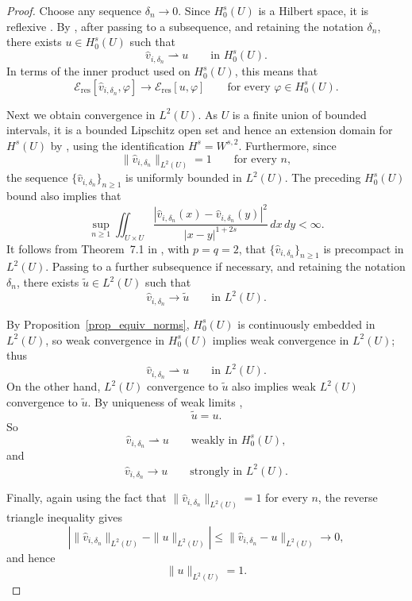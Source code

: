 \documentclass[preprint,12pt]{elsarticle}
\begin{document}
{\begin{proof}
Choose any sequence $\delta_n\to0$. Since $H_0^s(U)$ is a Hilbert
space, it is reflexive \cite[Th.~4.6-6]{Krey}. By
\cite[Th.~3.18]{Brezis}, after passing to a subsequence, and
retaining the notation $\delta_n$, there exists $u\in H_0^s(U)$
such that
\[
    \hat v_{i,\delta_n}
    \rightharpoonup u
    \qquad\text{in }H_0^s(U).
\]
In terms of the inner product used on $H_0^s(U)$, this means
that
\[
    \mathcal E_{\mathrm{res}}
    [\hat v_{i,\delta_n},\varphi]
    \longrightarrow
    \mathcal E_{\mathrm{res}}[u,\varphi]
    \qquad
    \text{for every }\varphi\in H_0^s(U).
\]

Next we obtain convergence in $L^2(U)$. As $U$ is a finite union
of bounded intervals, it is a bounded Lipschitz open set and hence
an extension domain for $H^s(U)$ by \cite[Th.~5.4]{NPV}, using the
identification $H^s=W^{s,2}$. Furthermore, since
\[
    \|\hat v_{i,\delta_n}\|_{L^2(U)}=1
    \qquad\text{for every }n,
\]
the sequence $\{\hat v_{i,\delta_n}\}_{n\geq1}$ is uniformly
bounded in $L^2(U)$. The preceding $H_0^s(U)$ bound also implies
that
\[
    \sup_{n\geq1}
    \iint_{U\times U}
    \frac{
        |\hat v_{i,\delta_n}(x)
        -\hat v_{i,\delta_n}(y)|^2
    }{
        |x-y|^{1+2s}
    }
    \,dx\,dy
    <\infty.
\]
It follows from Theorem~7.1 in \cite{NPV}, with $p=q=2$, that
$\{\hat v_{i,\delta_n}\}_{n\geq1}$ is precompact in $L^2(U)$.
Passing to a further subsequence if necessary, and retaining the
notation $\delta_n$, there exists $\widetilde u\in L^2(U)$ such
that
\[
    \hat v_{i,\delta_n}
    \longrightarrow \widetilde u
    \qquad\text{in }L^2(U).
\]

By Proposition~\ref{prop_equiv_norms}, $H_0^s(U)$ is continuously
embedded in $L^2(U)$, so weak convergence in $H_0^s(U)$ implies
weak convergence in $L^2(U)$; thus
\[
    \hat v_{i,\delta_n}
    \rightharpoonup u
    \qquad\text{in }L^2(U).
\]
On the other hand, $L^2(U)$ convergence to $\widetilde u$ also
implies weak $L^2(U)$ convergence to $\widetilde u$. By uniqueness
of weak limits \cite[Lem.~4.8-3]{Krey},
\[
    \widetilde u=u.
\]
So
\[
    \hat v_{i,\delta_n}
    \rightharpoonup u
    \qquad\text{weakly in }H_0^s(U),
\]
and
\[
    \hat v_{i,\delta_n}
    \longrightarrow u
    \qquad\text{strongly in }L^2(U).
\]

Finally, again using the fact that
$\|\hat v_{i,\delta_n}\|_{L^2(U)}=1$ for every $n$, the reverse
triangle inequality gives
\[
    \left|
        \|\hat v_{i,\delta_n}\|_{L^2(U)}
        -
        \|u\|_{L^2(U)}
    \right|
    \leq
    \|\hat v_{i,\delta_n}-u\|_{L^2(U)}
    \longrightarrow0,
\]
and hence
\[
    \|u\|_{L^2(U)}=1.
\]


\end{proof}}
\end{document}
